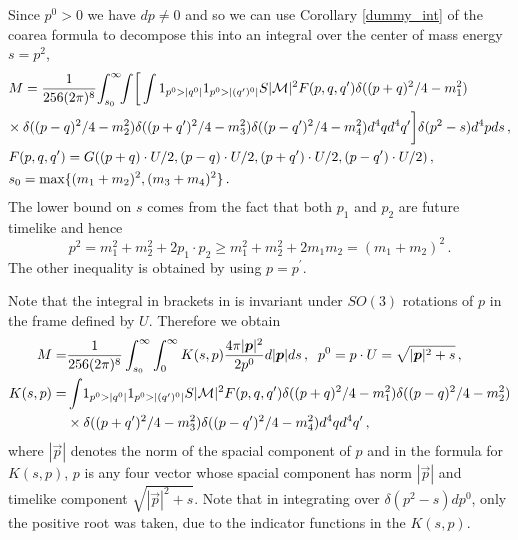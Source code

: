 Since $p^0>0$ we have $dp\neq 0$ and so we can use Corollary \ref{dummy_int} of the coarea formula to decompose this into an integral over the center of mass energy $s=p^2$,
\begin{align}\label{M_eq2}
&M=\frac{1}{256(2\pi)^8 }\!\int_{s_0}^\infty\!\!\int \!\bigg[\int 1_{p^0>|q^0|} 1_{p^0>|(q^{\prime})^0|}  S |\mathcal{M}|^2  F(p,q,q^{\prime}) \delta((p+q)^2/4-m_1^2)\\
&\!\times\delta((p-q)^2/4-m_2^2)\delta((p+q^{\prime})^2/4-m_3^2)\delta((p-q^{\prime})^2/4-m_4^2)d^4qd^4q^{\prime}\bigg]\delta(p^2-s) d^4pds\,,\notag\\
&F(p,q,q^{\prime})=G((p+q)\cdot U/2,(p-q)\cdot  U/2,(p+q^{\prime})\cdot U/2, (p-q^{\prime})\cdot U/2)\,,\notag\\
&s_0=\max\{(m_1+m_2)^2,(m_3+m_4)^2\}\,.\notag
\end{align}
The lower bound on $s$ comes from the fact that both $p_1$ and $p_2$ are future timelike and hence 
\begin{equation}
p^2=m_1^2+m_2^2+2p_1\cdot p_2\geq m_1^2+m_2^2+2m_1m_2=(m_1+m_2)^2\,.
\end{equation}
The other inequality is obtained by using $p=p^{\prime}$. 

Note that the integral in brackets in  is invariant under $SO(3)$ rotations of $p$ in the frame defined by $U$.  Therefore we obtain
\begin{align}\label{K_def}
M=&\frac{1}{256(2\pi)^8 }\int_{s_0}^\infty\int_0^\infty K(s,p)\frac{4\pi |\vec p|^2}{2p^0}d|\vec p|ds\,,\hspace{2mm} p^0=p\cdot U=\sqrt{|\vec p|^2+s}\,,\\
K(s,p)=&\int\! 1_{p^0>|q^0|} 1_{p^0>|(q^{\prime})^0|}  S |\mathcal{M}|^2  F(p,q,q^{\prime}) \delta((p+q)^2/4-m_1^2)\delta((p-q)^2/4-m_2^2)\notag\\
&\times\delta((p+q^{\prime})^2/4-m_3^2)\delta((p-q^{\prime})^2/4-m_4^2)d^4qd^4q^{\prime}\,,\notag
\end{align}
where $|\vec p|$ denotes the norm of the spacial component of $p$ and in the formula for $K(s,p)$, $p$ is any four vector whose spacial component has norm $|\vec p|$ and timelike component $\sqrt{|\vec p|^2+s}$. Note that in integrating over $\delta(p^2-s)dp^0$, only the positive root was taken, due to the indicator functions in the $K(s,p)$.

